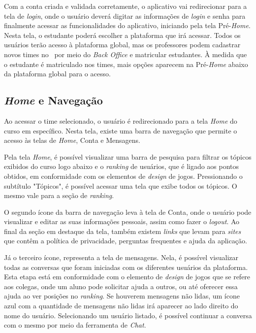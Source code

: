 Com a conta criada e validada corretamente, o aplicativo vai redirecionar para a tela de \textit{login}, onde o usuário deverá digitar as informações de \textit{login} e senha para finalmente acessar as funcionalidades do aplicativo, iniciando pela tela Pré-\textit{Home}. Nesta tela, o estudante poderá escolher a plataforma que irá acessar. Todos os usuários terão acesso à plataforma global, mas os professores podem cadastrar novos times no \appName\ por meio do \textit{Back Office} e matricular estudantes. À medida que o estudante é matriculado nos times, mais opções aparecem na Pré-\textit{Home} abaixo da plataforma global para o acesso.

\subsection{\textit{Home} e Navegação}
\label{home_navegacao}

Ao acessar o time selecionado, o usuário é redirecionado para a tela \textit{Home} do curso em específico. Nesta tela, existe uma barra de navegação que permite o acesso às telas de \textit{Home}, Conta e Mensagens.


Pela tela \textit{Home}, é possível visualizar uma barra de pesquisa para filtrar os tópicos exibidos do curso logo abaixo e o \textit{ranking} de usuários, que é ligado aos pontos obtidos, em conformidade com os elementos de \textit{design} de jogos. Pressionando o subtítulo "Tópicos", é possível acessar uma tela que exibe todos os tópicos. O mesmo vale para a seção de \textit{ranking}.

O segundo ícone da barra de navegação leva à tela de Conta, onde o usuário pode visualizar e editar as suas informações pessoais, assim como fazer o \textit{logout}. Ao final da seção em destaque da tela, também existem \textit{links} que levam para \textit{sites} que contêm a política de privacidade, perguntas frequentes e ajuda da aplicação.

Já o terceiro ícone, representa a tela de mensagens. Nela, é possível visualizar todas as conversas que foram iniciadas com os diferentes usuários da plataforma. Esta etapa está em conformidade com o elemento de \textit{design} de jogos que se refere aos colegas, onde um aluno pode solicitar ajuda a outros, ou até oferecer essa ajuda ao ver posições no \textit{ranking}. Se houverem mensagens não lidas, um ícone azul com a quantidade de mensagens não lidas irá aparecer ao lado direito do nome do usuário. Selecionando um usuário listado, é possível continuar a conversa com o mesmo por meio da ferramenta de \textit{Chat}.

